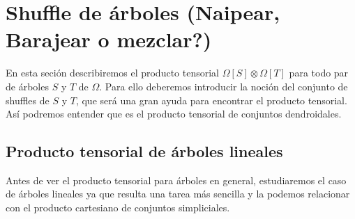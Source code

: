 \documentclass[../main.tex]{subfiles}
\begin{document}
\section{Shuffle de \'arboles (Naipear, Barajear o mezclar?)}
En esta seci\'on describiremos el producto tensorial $\Omega[S]\otimes\Omega[T]$ para todo par de \'arboles $S$ y $T$ de $\Omega$. Para ello deberemos introducir la noci\'on del conjunto de shuffles de $S$ y $T$, que ser\'a una gran ayuda para encontrar el producto tensorial. As\'i podremos entender que es el producto tensorial de conjuntos dendroidales.
\subsection{Producto tensorial de \'arboles lineales}
Antes de ver el producto tensorial para \'arboles en general, estudiaremos el caso de \'arboles lineales ya que resulta una tarea m\'as sencilla y la podemos relacionar con el producto cartesiano de conjuntos simpliciales.
\end{document}
